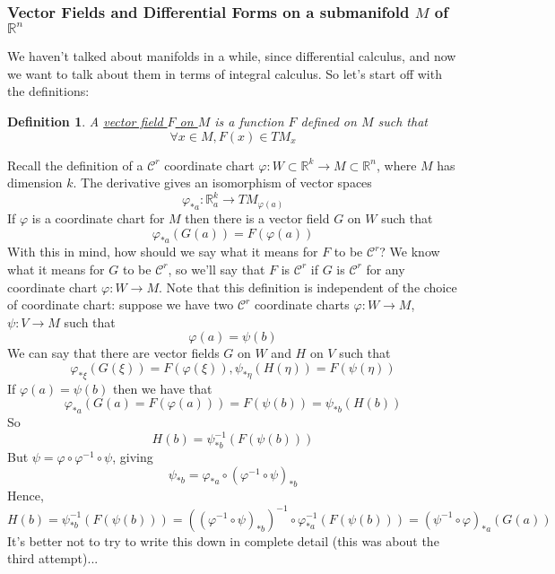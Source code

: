 \documentclass{article}
\newtheorem{definition}{Definition}
\newcommand{\reals}[0]{\mathbb{R}}
\newcommand{\mc}[1]{\mathcal{#1}}
\begin{document}
\subsubsection{Vector Fields and Differential Forms on a submanifold \(M\) of \(\reals^n\)}

We haven't talked about manifolds in a while, since differential calculus, and now we want to talk about them in terms of integral calculus. So let's start off with the definitions:
\begin{definition}
  A \underline{vector field \(F\) on \(M\)} is a function \(F\) defined on \(M\) such that
  \begin{equation}
    \forall x \in M, F(x) \in TM_x
  \end{equation}
\end{definition}
Recall the definition of a \(\mc{C}^r\) coordinate chart \(\varphi: W \subset \reals^k \to M \subset \reals^n\), where \(M\) has dimension \(k\). The derivative gives an isomorphism of vector spaces
\begin{equation}
  \varphi_{*a} : \reals_a^k \to TM_{\varphi(a)}
\end{equation}
If \(\varphi\) is a coordinate chart for \(M\) then there is a vector field \(G\) on \(W\) such that
\begin{equation}
  \varphi_{*a}(G(a)) = F(\varphi(a))
\end{equation}
With this in mind, how should we say what it means for \(F\) to be \(\mc{C}^r\)? We know what it means for \(G\) to be \(\mc{C}^r\), so we'll say that \(F\) is \(\mc{C}^r\) if \(G\) is \(\mc{C}^r\) for any coordinate chart \(\varphi: W \to M\). Note that this definition is independent of the choice of coordinate chart: suppose we have two \(\mc{C}^r\) coordinate charts \(\varphi: W \to M\), \(\psi : V \to M\) such that
\begin{equation}
  \varphi(a) = \psi(b)
\end{equation}
We can say that there are vector fields \(G\) on \(W\) and \(H\) on \(V\) such that
\begin{equation}
  \varphi_{*\xi}(G(\xi)) = F(\varphi(\xi)), \psi_{*\eta}(H(\eta)) = F(\psi(\eta))
\end{equation}
If \(\varphi(a) = \psi(b)\) then we have that
\begin{equation}
  \varphi_{*a}(G(a) = F(\varphi(a))) = F(\psi(b)) = \psi_{*b}(H(b))
\end{equation}
So
\begin{equation}
  H(b) = \psi_{*b}^{-1}(F(\psi(b)))
\end{equation}
But \(\psi = \varphi \circ \varphi^{-1} \circ \psi\), giving
\begin{equation}
  \psi_{*b} = \varphi_{*a} \circ (\varphi^{-1} \circ \psi)_{*b}
\end{equation}
Hence,
\begin{equation}
  H(b) = \psi_{*b}^{-1}(F(\psi(b))) = ((\varphi^{-1} \circ \psi)_{*b})^{-1} \circ \varphi^{-1}_{*a}(F(\psi(b))) = (\psi^{-1} \circ \varphi)_{*a}(G(a))
\end{equation}
It's better not to try to write this down in complete detail (this was about the third attempt)...
\end{document}
